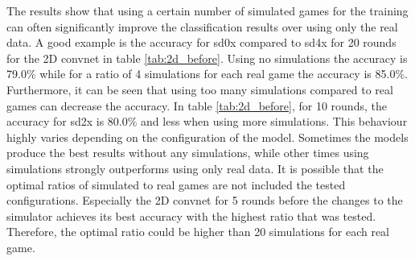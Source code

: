 

The results show that using a certain number of simulated games for the training can often significantly improve the classification results over using only the real data. A good example is the accuracy for sd0x compared to sd4x for 20 rounds for the 2D convnet in table \ref{tab:2d_before}. Using no simulations the accuracy is 79.0\% while for a ratio of 4 simulations for each real game the accuracy is 85.0\%. Furthermore, it can be seen that using too many simulations compared to real games can decrease the accuracy. In table \ref{tab:2d_before}, for 10 rounds, the accuracy for sd2x is 80.0\% and less when using more simulations. This behaviour highly varies depending on the configuration of the model. Sometimes the models produce the best results without any simulations, while other times using simulations strongly outperforms using only real data. It is possible that the optimal ratios of simulated to real games are not included the tested configurations. Especially the 2D convnet for 5 rounds before the changes to the simulator achieves its best accuracy with the highest ratio that was tested. Therefore, the optimal ratio could be higher than 20 simulations for each real game. 

